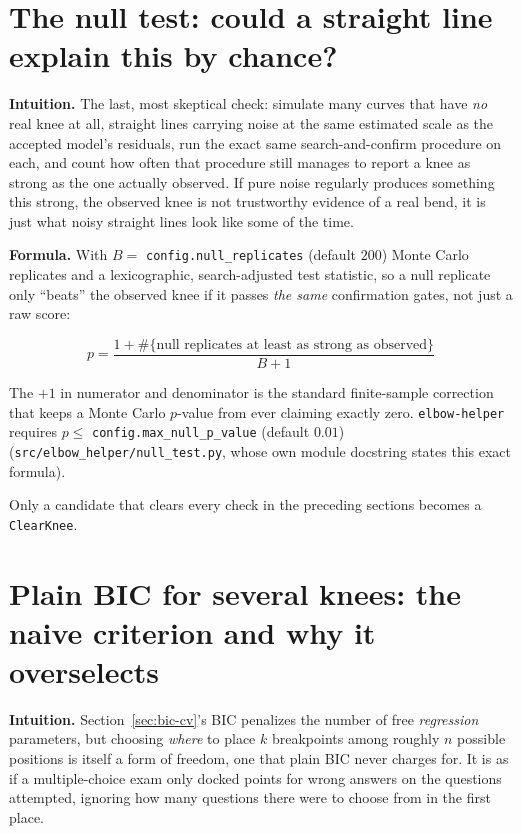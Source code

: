 \documentclass[11pt]{article}
\newcommand{\code}[1]{\texttt{#1}}
\begin{document}
\section{The null test: could a straight line explain this by chance?}
\label{sec:null-test}

\textbf{Intuition.} The last, most skeptical check: simulate many curves
that have \emph{no} real knee at all, straight lines carrying noise at the
same estimated scale as the accepted model's residuals, run the exact same
search-and-confirm procedure on each, and count how often that procedure
still manages to report a knee as strong as the one actually observed. If
pure noise regularly produces something this strong, the observed knee is
not trustworthy evidence of a real bend, it is just what noisy straight
lines look like some of the time.

\textbf{Formula.} With $B = $ \code{config.null\_replicates} (default
$200$) Monte Carlo replicates and a lexicographic, search-adjusted test
statistic, so a null replicate only ``beats'' the observed knee if it
passes \emph{the same} confirmation gates, not just a raw score:

\begin{equation}
p = \frac{1 + \#\{\text{null replicates at least as strong as observed}\}}{B + 1}
\end{equation}

The $+1$ in numerator and denominator is the standard finite-sample
correction that keeps a Monte Carlo $p$-value from ever claiming exactly
zero. \code{elbow-helper} requires $p \le$ \code{config.max\_null\_p\_value}
(default $0.01$) (\code{src/elbow\_helper/null\_test.py}, whose own module
docstring states this exact formula).

Only a candidate that clears every check in the preceding sections becomes
a \code{ClearKnee}.

\section{Plain BIC for several knees: the naive criterion and why it overselects}

\textbf{Intuition.} Section~\ref{sec:bic-cv}'s BIC penalizes the number of
free \emph{regression} parameters, but choosing \emph{where} to place $k$
breakpoints among roughly $n$ possible positions is itself a form of
freedom, one that plain BIC never charges for. It is as if a
multiple-choice exam only docked points for wrong answers on the questions
attempted, ignoring how many questions there were to choose from in the
first place.
\end{document}
